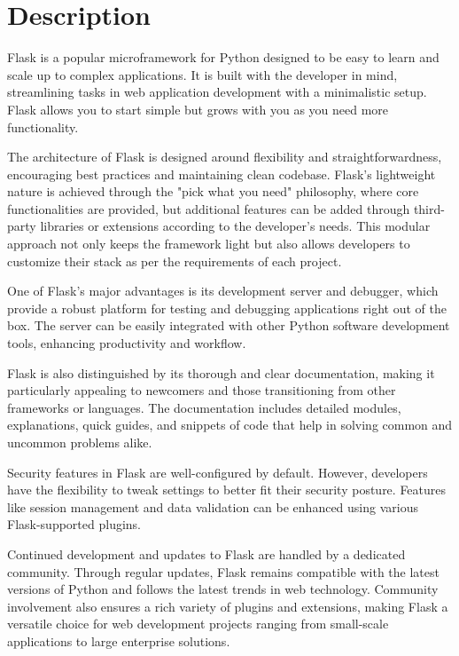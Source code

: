 \section{Description}

Flask is a popular microframework for Python designed to be easy to learn and scale up to complex applications. It is built with the developer in mind, streamlining tasks in web application development with a minimalistic setup. Flask allows you to start simple but grows with you as you need more functionality.

The architecture of Flask is designed around flexibility and straightforwardness, encouraging best practices and maintaining clean codebase. Flask's lightweight nature is achieved through the "pick what you need" philosophy, where core functionalities are provided, but additional features can be added through third-party libraries or extensions according to the developer's needs. This modular approach not only keeps the framework light but also allows developers to customize their stack as per the requirements of each project. 

One of Flask's major advantages is its development server and debugger, which provide a robust platform for testing and debugging applications right out of the box. The server can be easily integrated with other Python software development tools, enhancing productivity and workflow.\cite{Grinberg:2018}

Flask is also distinguished by its thorough and clear documentation, making it particularly appealing to newcomers and those transitioning from other frameworks or languages. The documentation includes detailed modules, explanations, quick guides, and snippets of code that help in solving common and uncommon problems alike.

Security features in Flask are well-configured by default. However, developers have the flexibility to tweak settings to better fit their security posture. Features like session management and data validation can be enhanced using various Flask-supported plugins.

Continued development and updates to Flask are handled by a dedicated community. Through regular updates, Flask remains compatible with the latest versions of Python and follows the latest trends in web technology. Community involvement also ensures a rich variety of plugins and extensions, making Flask a versatile choice for web development projects ranging from small-scale applications to large enterprise solutions.\cite{Gaspar:2018}


